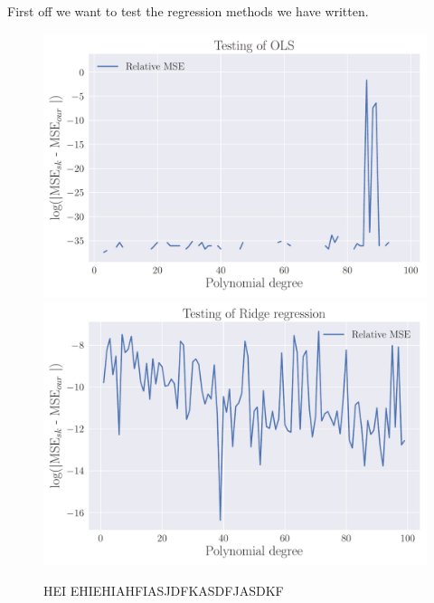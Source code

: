 \documentclass[reprint,english,notitlepage,aps,nobalancelastpage,nofootinbib]{revtex4-1}  %
\begin{document}
First off we want to test the regression methods we have written.
\begin{figure}[H]
	\includegraphics[width=\linewidth]{Testing_OLS.pdf}
	\endminipage\hfill
	\includegraphics[width=\linewidth]{Testing_Ridge.pdf}
	\endminipage
	\caption{HEI EHIEHIAHFIASJDFKASDFJASDKF}
	\label{fig:test_OLS_Ridge}
\end{figure}
\end{document}
